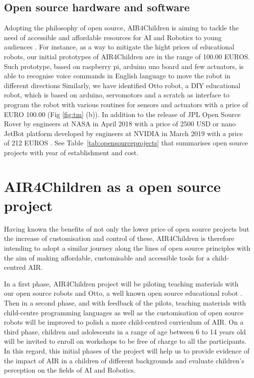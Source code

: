 \documentclass[sigconf]{acmart}
\begin{document}
\subsection{Open source hardware and software}
Adopting the philosophy of open source, AIR4Children is aiming to tackle the need of accessible and affordable resources for AI and Robotics to young audiences \cite{UNICEF2020}.
For instance, as a way to mitigate the hight prices of educational robots, our initial prototypes of AIR4Children are in the range of 100.00 EUROS. 
Such prototype, based on raspberry pi, arduino uno board and few actuators, is able to recognise voice commands in English language to move the robot in different directions 
Similarly, we have identified Otto robot, a DIY educational robot, which is based on arduino, servomotors and a scratch as interface to program the robot with various routines for sensors and actuators with a price of EURO 100.00 (Fig \ref{fig:tm} (b)). 
In addition to the release of JPL Open Source Rover by engineers at NASA in April 2018 with a price of 2500 USD \cite{OSR:2018} or
nano JetBot platform developed by engineers at NVIDIA in March 2019 with a price of 212 EUROS \cite{nanoJetBot:2019}. 
See Table~\ref{tab:opensourceprojects} that summarises open source projects with year of establishment and cost.


\section{AIR4Children as a open source project}
Having known the benefits of not only the lower price of open source projects but the increase of customisation and control of these, AIR4Children is therefore intending to adopt a similar journey along the lines of open source principles with the aim of making affordable, customisable and accessible tools for a child-centred AIR.

In a first phase, AIR4Children project will be piloting teaching materials with our open source robots and Otto, a well known open source educational robot \cite{OttoDIY:2016}.  
Then in a second phase, and with feedback of the pilots, teaching materials with child-centre programming languages as well as the customisation of open source robots will be improved to polish a more child-centred curriculum of AIR. 
On a third phase, children and adolescents in a range of age between 6 to 14 years old will be invited to enroll on workshops to be free of charge to all the participants. 
In this regard, this initial phases of the project will help us to provide evidence of the impact of AIR in a children of different backgrounds and evaluate children's perception on the fields of AI and Robotics.  
\end{document}
